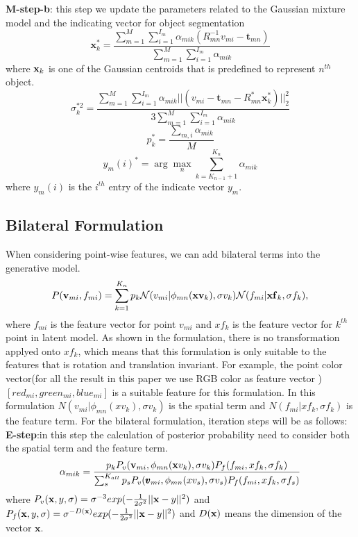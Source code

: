 \textbf{M-step-b}: this step we update the parameters related to the Gaussian mixture model and the indicating vector for object segmentation 
\begin{equation}
\label{equ:updatexk}
\pmb x_k^*=\frac{\sum_{m=1}^M\sum_{i=1}^{I_m}\alpha_{mik}(R_{mn}^{-1}v_{mi}-\pmb t_{mn})}{\sum_{m=1}^M\sum_{i=1}^{I_m}\alpha_{mik}}
\end{equation}
where $\mathbf{x}_k$ is one of the Gaussian centroids that is predefined to represent  $n^{th}$ object. 
\begin{equation}
\label{equ:updatesigma}
\sigma_k^{*2}=\frac{\sum_{m=1}^M\sum_{i=1}^{I_m}\alpha_{mik}||(v_{mi}-\pmb t_{mn}-R_{mn}^*\pmb x_k^*)||_2^2}{3\sum_{m=1}^M\sum_{i=1}^{I_m}\alpha_{mik}}
\end{equation}
\begin{equation}
\label{equ:updatepk}
p_k^*=\frac{\sum_{m,i}\alpha_{mik}}{M}
\end{equation}
\begin{equation}
\label{equ:updatey}
y_{m}(i)^*=\arg \max_n \sum_{k=K_{n-1}+1}^{K_n} \alpha_{mik} 
\end{equation}
where $y_{m}(i)$ is the $i^{th}$ entry of the indicate vector $y_m$.
\subsection{Bilateral Formulation}
When considering point-wise features, we can add bilateral terms into the generative model.
\begin{equation}
P(\mathbf{v}_{mi},f_{mi})=\sum^{K_n}_{k=1}p_k\mathcal{N}(v_{mi}|\phi_{mn}(\mathbf{xv}_k),\sigma v_k)\mathcal{N}(f_{mi}|\mathbf{xf}_k,\sigma f_k),
\end{equation}
where $f_{mi}$ is the feature vector for point $v_{mi}$ and $xf_k$ is the feature vector for $k^{th}$ point in latent model. As shown in the formulation, there is no transformation applyed onto $xf_k$, which means that this formulation is only suitable to the features that is rotation and translation invariant. For example, the point color vector(for all the result in this paper we use RGB color as feature vector ) $[red_{mi},green_{mi},blue_{mi}]$ is a suitable feature for this formulation. In this formulation $N(v_{mi}|\phi_{mn}(xv_k),\sigma v_k)$ is the spatial term and $N(f_{mi}|xf_k,\sigma f_k)$ is the feature term.
For the bilateral formulation, iteration steps will be as follows:\\
\textbf{E-step}:in this step the calculation of posterior probability need to consider both the spatial term and the feature term.
\begin{equation}
\label{equ:bestep}
\alpha_{mik}=\frac{p_kP_v( \mathbf{v}_{mi},\phi_{mn}(\mathbf{x}v_k),\sigma v_k)P_f(f_{mi},xf_k,\sigma f_k)}{\sum_s^{K_{all}}p_sP_v( \pmb v_{mi},\phi_{mn}(xv_s),\sigma v_s)P_f(f_{mi},xf_k,\sigma f_s)}
\end{equation}
where $P_v(\mathbf{x},y,\sigma)=\sigma^{-3}exp(-\frac{1}{2\sigma^2}||\mathbf{x}-y||^2)$ and $P_f(\mathbf{x},y,\sigma)=\sigma^{-D(\mathbf{x})}exp(-\frac{1}{2\sigma^2}||\mathbf{x}-y||^2)$ and $D(\mathbf{x})$ means the dimension of the vector $\pmb x$. 




